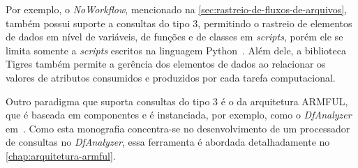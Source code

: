 Por exemplo, o \textit{NoWorkflow}, mencionado na \autoref{sec:rastreio-de-fluxos-de-arquivos}, também possui suporte a consultas do tipo 3, permitindo o rastreio de elementos de dados em nível de variáveis, de funções e de classes em \textit{scripts}, porém ele se limita somente a \textit{scripts} escritos na linguagem Python~\cite{murta2014noworkflow}. Além dele, a biblioteca Tigres também permite a gerência dos elementos de dados ao relacionar os valores de atributos consumidos e produzidos por cada tarefa computacional.

Outro paradigma que suporta consultas do tipo 3 é o da arquitetura ARMFUL, que é baseada em componentes e é instanciada, por exemplo, como o \textit{DfAnalyzer} em~\cite{silva2017raw}. Como esta monografia concentra-se no desenvolvimento de um processador de consultas no \textit{DfAnalyzer}, essa ferramenta é abordada detalhadamente no \autoref{chap:arquitetura-armful}.